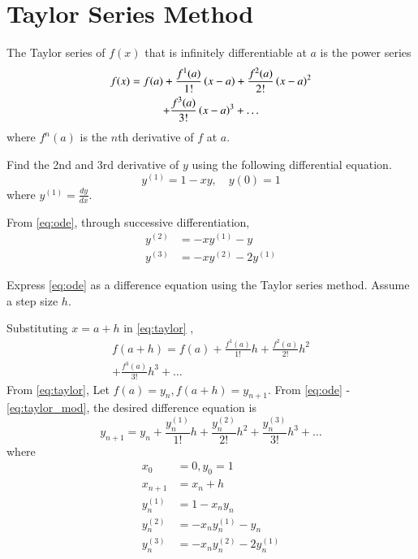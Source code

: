 \documentclass[journal,12pt,twocolumn]{IEEEtran}
\begin{document}
\section{Taylor Series Method}
\begin{definition}
\label{def:taylor}
The Taylor series of $f(x)$ that is infinitely differentiable at $a$ is the power series
\begin{multline}
\label{eq:taylor}
f(x) = f(a) + \frac{f^{1}(a)}{1!} \left(x-a\right)+  \frac{f^{2}(a)}{2!}\left(x-a\right)^2
\\
+ \frac{f^{3}(a)}{3!}\left(x-a\right)^3+\dots
\end{multline}
where $f^{n}(a)$ is the $n$th derivative of $f$ at $a$.
%
\end{definition}
\begin{problem}
Find the 2nd and 3rd derivative of $y$ using the following differential equation.
\begin{equation}
\label{eq:ode}
y^{(1)} = 1 - xy, \quad y(0) = 1
\end{equation}
where 
$y^{(1)} = \frac{dy}{dx}$.
\end{problem}
\solution From \eqref{eq:ode}, through successive differentiation,
\begin{align}
\label{eq:taylor_der}
y^{(2)} &= -xy^{(1)} - y 
\\
y^{(3)} &=  -xy^{(2)} -2y^{(1)} 
\label{eq:taylor_mod_der}
\end{align}
%
\begin{problem}
Express \eqref{eq:ode}
as a difference equation using the Taylor series method.  Assume a step size $h$.
\end{problem}
%
\solution
Substituting $x = a+h$ in \eqref{eq:taylor} \cite{taylor},
%
\begin{multline}
\label{eq:taylor_mod}
f(a+h) = f(a) + \frac{f^{1}(a)}{1!} h+  \frac{f^{2}(a)}{2!}h^2
\\
+ \frac{f^{3}(a)}{3!}h^3+\dots
\end{multline}
%
From \eqref{eq:taylor},
Let $f(a) = y_n, f(a+h) = y_{n+1}$.  From \eqref{eq:ode} - \eqref{eq:taylor_mod}, the desired difference equation is
\begin{equation}
\label{eq:taylor_diff}
y_{n+1} = y_n + \frac{y_n^{(1)}}{1!} h+  \frac{y_n^{(2)}}{2!}h^2
+ \frac{y_n^{(3)}}{3!}h^3+\dots
\end{equation}
where 
\begin{align}
x_0 &= 0, 
y_0 = 1
\\
x_{n+1} &= x_{n}+h
\\
y_n^{(1)} &= 1-x_ny_n
\\
y_n^{(2)} &= -x_ny_n^{(1)} - y_n 
\\
y_n^{(3)} &=  - x_ny_n^{(2)} -2y_n^{(1)} 
\end{align}
\end{document}
